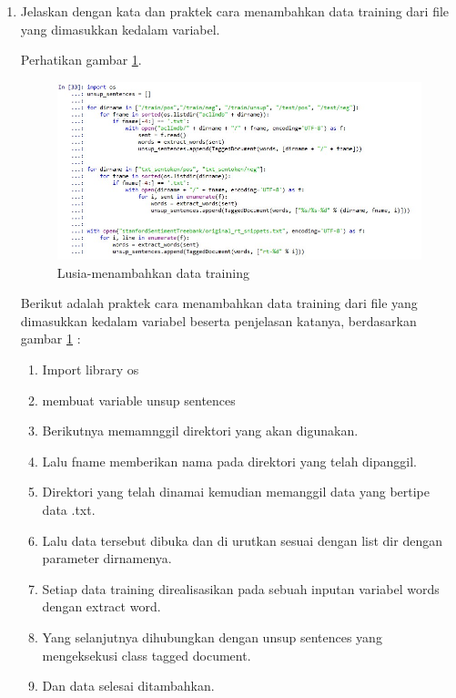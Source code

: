\begin{enumerate}
\begin{enumerate}
	\item Praktek pemakaian :
	 \par Perhatikan gambar \ref{5b17}. Gambar tersebut merupakan output dari praktek pemakaian TaggedDocument dan Doc2Vec.
	 \begin{itemize}
	 \item Baris 1 = mengimport TaggedDocument dari library gensim
	 \item Baris 2 = mengimport Doc2Vec dari library gensim
	 \end{itemize}
	  		
	\end{enumerate}

\item Jelaskan dengan kata dan praktek cara menambahkan data training dari file yang dimasukkan kedalam variabel.
	\par Perhatikan gambar \ref{5b18}.
	\begin{figure}[!hbtp]
	\centering
	\includegraphics[scale=0.5]{figures/q4.jpg}
	\caption{Lusia-menambahkan data training}
	\label{5b18}
	\end{figure}
	\par Berikut adalah praktek cara menambahkan data training dari file yang dimasukkan kedalam variabel beserta penjelasan katanya, berdasarkan gambar \ref{5b18} :
	\begin{enumerate}
	\item Import library os
	\item membuat variable unsup sentences
	\item Berikutnya memamnggil direktori yang akan digunakan.
	\item Lalu fname memberikan nama pada direktori yang telah dipanggil.
	\item Direktori yang telah dinamai kemudian memanggil data yang bertipe data .txt.
	\item Lalu data tersebut dibuka dan di urutkan sesuai dengan list dir dengan parameter dirnamenya.
	\item Setiap data training direalisasikan pada sebuah inputan variabel words dengan extract word.
	\item Yang selanjutnya dihubungkan dengan unsup sentences yang mengeksekusi class tagged document.
	\item Dan data selesai ditambahkan.
	\end{enumerate}


\end{enumerate}
